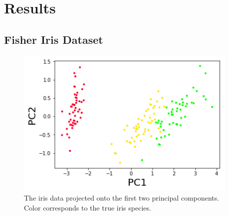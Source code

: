 \documentclass[a0,plainsections,30pt]{sciposter}\usepackage[]{graphicx}\usepackage[]{color}
\begin{document}
\hfill \vrule \hfill
\begin{minipage}[t]{0.45\textwidth}




\section*{Results}
\vspace{-0.3in}

\begin{minipage}[t]{0.49\textwidth}
    \subsection*{Fisher Iris Dataset}
    \begin{figure}[!h]
    \centering
    \includegraphics[width = 0.95\textwidth]{./static_images/iris_data.png}
    \caption{The iris data projected onto the first two principal components. Color corresponds to the true iris species.}
    \setlength{\textfloatsep}{-10pt}
    \end{figure}
\end{minipage}
%
\begin{minipage}[t]{0.49\textwidth}

\end{minipage}
\end{minipage}
\end{document}

